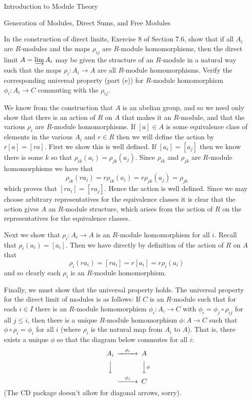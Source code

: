 \begin{chapter}{Introduction to Module Theory}
\begin{section}{Generation of Modules, Direct Sums, and Free Modules}
\begin{solution}
\end{solution}\oneperpage



\begin{problem}\label{ex:10.3.25}
In the construction of direct limits, Exercise 8 of Section 7.6, show that if all $A_i$ are $R$-modules and the maps $\rho_{ij}$ are $R$-module homomorphisms, then the direct limit $A=\varinjlim A_i$ may be given the structure of an $R$-module in a natural way such that the maps $\rho_i:A_i\to A$ are all $R$-module homomorphisms. Verify the corresponding universal property (part (e)) for $R$-module homomorphism $\phi_i:A_i\to C$ commuting with the $\rho_{ij}$. 
\end{problem}
\begin{solution}
We know from the construction that $A$ is an abelian group, and so we need only show that there is an action of $R$ on $A$ that makes it an $R$-module, and that the various $\rho_i$ are $R$-module homomorphisms. If $[a]\in A$ is some equivalence class of elements in the various $A_i$ and $r\in R$ then we will define the action by $r[a] = [ra]$. First we show this is well defined. If $[a_i] = [a_j]$ then we know there is some $k$ so that $\rho_{ik}(a_i) = \rho_{jk}(a_j)$. Since $\rho_{ik}$ and $\rho_{jk}$ are $R$-module homomorphisms we have that  \[\rho_{ik}(ra_i) = r\rho_{ik}(a_i) = r\rho_{jk}(a_j) = \rho_{jk}\]
which proves that $[ra_i] = [ra_j]$. Hence the action is well defined. Since we may choose arbitrary representatives for the equivalence classes it is clear that the action gives $A$ an $R$-module structure, which arises from the action of $R$ on the representatives for the equivalence classes.

Next we show that $\rho_i:A_i\to A$ is an $R$-module homomorphism for all $i$. Recall that $\rho_i(a_i) = [a_i]$. Then we have directly by definition of the action of $R$ on $A$ that \[
\rho_i(ra_i) = [ra_i] = r[a_i] = r\rho_i(a_i)
\]
and so clearly each $\rho_i$ is an $R$-module homomorphism. 

Finally, we must show that the universal property holds. The universal property for the direct limit of modules is as follows: If $C$ is an $R$-module  such that for each $i\in I$ there is an $R$-module homomorphism $\phi_i: A_i\to C$ with $\phi_i = \phi_j\circ \rho_{ij}$ for all $j\le i$, then there is a unique $R$-module homomorphism $\phi:A\to C$ such that $\phi\circ \rho_i = \phi_i$ for all $i$ (where $\rho_i$ is the natural map from $A_i$ to $A$). That is, there exists a unique $\phi$ so that the diagram below commutes for all $i$:\[
\begin{CD}
A_i @>\rho_i >> A\\
@VVV @VV\phi V\\
@>\phi_i>> C
\end{CD}
\]
(The CD package doesn't allow for diagonal arrows, sorry).


\end{solution}
\end{section}
\end{chapter}
